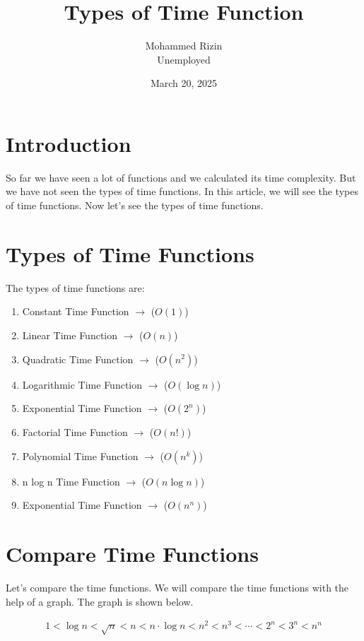 \documentclass[]{article}
\title{Types of Time Function}
\author{Mohammed Rizin \\ Unemployed}
\date{March 20, 2025}
\begin{document}
\maketitle

\section{Introduction}
So far we have seen a lot of functions and we calculated its time complexity. But we have not seen the types of time functions. In this article, we will see the types of time functions. 
Now let's see the types of time functions.

\section{Types of Time Functions}
The types of time functions are:
\begin{enumerate}
    \item Constant Time Function $\rightarrow$ ($O(1)$)
    \item Linear Time Function $\rightarrow$ ($O(n)$)
    \item Quadratic Time Function $\rightarrow$ ($O(n^2)$)
    \item Logarithmic Time Function $\rightarrow$ ($O(\log n)$)
    \item Exponential Time Function $\rightarrow$ ($O(2^n)$)
    \item Factorial Time Function $\rightarrow$ ($O(n!)$)
    \item Polynomial Time Function $\rightarrow$ ($O(n^k)$)
    \item n log n Time Function $\rightarrow$ ($O(n \log n)$)
    \item Exponential Time Function $\rightarrow$ ($O(n^n)$)
\end{enumerate}

\section{Compare Time Functions}
Let's compare the time functions. We will compare the time functions with the help of a graph. The graph is shown below.

\[
\begin{aligned}
    1 < \log{n} < \sqrt{n} < n < n\cdot \log{n} < n^2 < n^3 < \cdots < 2^n <  3^n < n^n
\end{aligned}
\]
\end{document}
